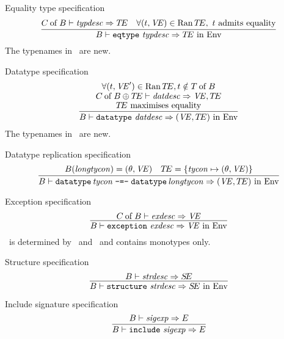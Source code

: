 \begin{inference-rule}{Equality type specification}
\begin{equation}\label{rule:static-modules:eqtype-specification}
\vcenter{\infer{\B\ts\eqtypespec\ra\TE\ \In\ \Env}
  {\of{\C}{\B}\ts\typdesc\ra\TE
    & \forall(\t,\VE)\in \Ran\TE,\ \t {\rm\ admits\ equality}}}
\end{equation}
The typenames in \TE\ are new.
\end{inference-rule}

\begin{inference-rule}{Datatype specification}
\begin{equation}\label{rule:static-modules:data-specification}
\vcenter{\infer{\B\ts\datatypespec\ra(\VE,\TE)\ \In\ \Env}
  {\deduce{\hbox{$\TE$ maximises equality}}
    {\deduce{\of{\C}{\B}\oplus\TE\ts\datdesc\ra\VE,\TE}
      {\forall(\t,\VE')\in\Ran\TE, \t\notin\of{\T}{\B}}}}}
\end{equation}
The typenames in \TE\ are new.
\end{inference-rule}

\begin{inference-rule}{Datatype replication specification}
\begin{equation}\label{rule:static-modules:datatypereplspec}
\vcenter{\infer{\B\ts\datatypereplspec\ra (\VE,\TE)\ \In\ \Env}
    {\B(\longtycon) = (\typefcn,\VE)
      & \TE = \{\tycon\mapsto(\typefcn,\VE)\}}}
\end{equation}
\end{inference-rule}

\begin{inference-rule}{Exception specification}
\begin{equation}\label{rule:static-modules:exceptionspec}
\vcenter{\infer{\B\ts\exceptionspec\ra\VE\ \In\ \Env}
  {\of{\C}{\B}\ts\exndesc\ra\VE}}
\end{equation}
\VE\ is determined by \B\ and \exndesc\ and contains monotypes only.
\end{inference-rule}

\begin{inference-rule}{Structure specification}
\begin{equation}\label{rule:static-modules:structurespec}
\vcenter{\infer{\B\ts\structurespec\ra\SE\ \In\ \Env}
  {\B\ts\strdesc\ra\SE}}
\end{equation}
\end{inference-rule}

\begin{inference-rule}{Include signature specification}
\begin{equation}\label{rule:static-modules:include-signature}
\vcenter{\infer{ \B\ts\singleinclspec\ra\E }{  \B\ts\sigexp\ra\E}}
\end{equation}
\end{inference-rule}

